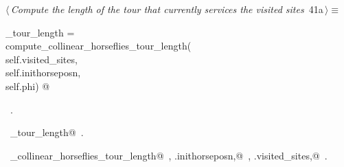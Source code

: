\documentclass[11.5pt]{report}
\begin{document}
\vspace{-0.8cm}\newchunk 

\begin{flushleft} \small\label{scrap56}\raggedright\small
{} $\langle\,${\itshape Compute the length of the tour that currently services the visited sites}\nobreak\ {\footnotesize {41a}}$\,\rangle\equiv$
\vspace{-1ex}
\begin{list}{}{} \item
\mbox{}\verb@current_tour_length    = \@\\
\mbox{}\verb@         compute_collinear_horseflies_tour_length(\@\\
\mbox{}\verb@                    self.visited_sites,\@\\
\mbox{}\verb@                    self.inithorseposn,\@\\
\mbox{}\verb@                    self.phi) @\\
\mbox{}\verb@@{\NWsep}
\end{list}
\vspace{-1.5ex}
\footnotesize
\begin{list}{}{\setlength{\itemsep}{-\parsep}\setlength{\itemindent}{-\leftmargin}}
\item \NWtxtMacroRefIn\ .
\item \NWtxtIdentsDefed\nobreak\  \verb@current_tour_length@\nobreak\ .\item \NWtxtIdentsUsed\nobreak\  \verb@compute_collinear_horseflies_tour_length@\nobreak\ , \verb@self.inithorseposn,@\nobreak\ , \verb@self.visited_sites,@\nobreak\ .
\item{}
\end{list}
\vspace{4ex}
\end{flushleft}

\vspace{-0.8cm}\newchunk 
\end{document}
